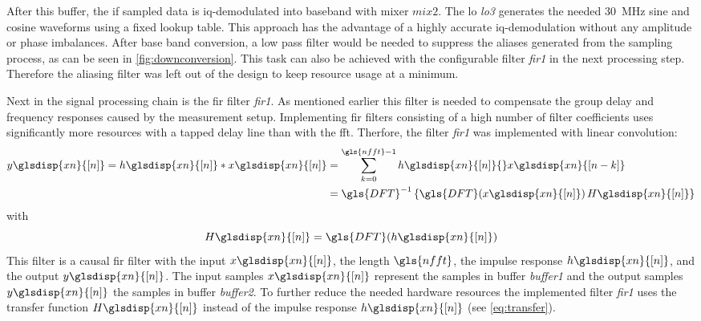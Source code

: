 \documentclass[12pt,a4paper,parskip=full,abstract=true,BCOR=12mm,twoside,open=right]{scrreprt}
\def\device#1{\mbox{\textit{#1}}}
\newcommand{\XN}{\glsdisp{xn}{[n]}}
\begin{document}
After this buffer, the \gls{if} sampled data is \gls{iq}-demodulated into baseband
with mixer $mix2$. The \gls{lo} \device{lo3} generates the needed
\SI{30}{\mega\hertz} sine and cosine waveforms using a fixed lookup table. This
approach has the advantage of a highly accurate
\gls{iq}-demodulation without any amplitude or phase imbalances. After base band
conversion, a low pass filter would be needed to
suppress the aliases generated from the sampling process, as can be seen in
\cref{fig:downconversion}. This task can also be achieved with the configurable
filter \device{fir1} in the next processing step. Therefore the aliasing filter
was left out of the design to keep resource usage at a minimum.

Next in the signal processing chain is the \gls{fir} filter \device{fir1}. As mentioned earlier
this filter is needed to compensate the group delay and frequency responses caused by the
measurement setup. Implementing \gls{fir} filters consisting of a high number of filter
coefficients uses significantly more resources with a tapped delay line than with
the \gls{fft}. Therfore, the filter \device{fir1} was implemented with linear convolution:
\begin{equation}
    \begin{split}
    \label{eq:circ} y\XN = h\XN * x\XN & = \sum_{k=0}^{\gls{nfft}-1} h\XN{}x\glsdisp{xn}{[n-k]}\\
         & = \gls{DFT}^{-1}\left\{\gls{DFT}(x\XN)\,H\XN\right\}
    \end{split}
\end{equation}
with
\begin{equation}
    \label{eq:transfer} H\XN = \gls{DFT}(h\XN)
\end{equation}
This filter is a causal \gls{fir} filter with the input $x\XN$, the length $\gls{nfft}$,
the impulse response $h\XN$, and the output $y\XN$. The input samples $x\XN$ represent
the samples in buffer \device{buffer1} and the output samples $y\XN$ the samples in
buffer \device{buffer2}. To further reduce the needed hardware resources the implemented
filter \device{fir1} uses the transfer function $H\XN$ instead of the impulse response $h\XN$
(see \cref{eq:transfer}).
\end{document}
